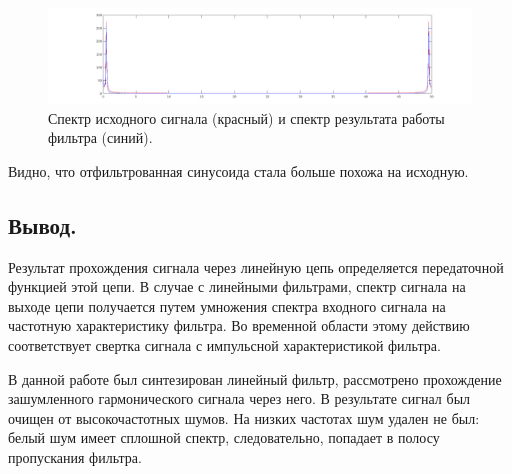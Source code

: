 \documentclass[a4paper,14pt]{extarticle}
\begin{document}
\begin{figure}[H]
\centering
\includegraphics[scale=0.38]{pics/3filtered_-3_changed_spec.png} 
\caption{Спектр исходного сигнала (красный) и спектр результата работы фильтра (синий).}
\label{filtered_-3_changed_spec}
\end{figure}

Видно, что отфильтрованная синусоида стала больше похожа на исходную.

\subsection{Вывод.}
Результат прохождения сигнала через линейную цепь определяется передаточной функцией этой цепи. В случае с линейными фильтрами, спектр сигнала на выходе цепи получается путем умножения спектра входного сигнала на частотную характеристику фильтра. Во временной области этому действию соответствует свертка сигнала с импульсной характеристикой фильтра. 

В данной работе был синтезирован линейный фильтр, рассмотрено прохождение зашумленного гармонического сигнала через него. В результате сигнал был очищен
от высокочастотных шумов. На низких частотах шум удален не был: белый шум имеет сплошной спектр, следовательно, попадает в полосу пропускания фильтра.
\end{document}
